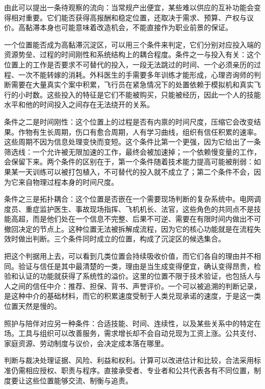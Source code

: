 由此可以提出一条待观察的流向：当常规产出便宜，某些难以供应的互补功能会变得相对重要。它们能否获得高报酬和稳定位置，还取决于需求、预算、产权与议价。高黏滞本身也可能意味着改造机会，不能直接作为职业前景的保证。


一个位置能否成为高黏滞沉淀区，可以用三个条件来判定，它们分别对应投入端的资源势垒、过程的时间刚性和系统结构上的耦合程度。条件之一与投入有关：这个位置上的工作是否要求不可替代的投入，一段无法跳过的时间、一个必须亲历的过程、一次不能转嫁的消耗。外科医生的手需要多年训练才能形成，心理咨询师的判断需要在大量真实个案中积累，飞行员在紧急情况下的处置依赖于模拟机和真实飞行的小时数。这些投入的特征是它们不能被购买，只能被经历，因此一个人的技能水平和他的时间投入之间存在无法绕开的关系。

条件之二是时间刚性：这个位置上的过程是否有内禀的时间尺度，压缩它会改变结果。作物有生长周期，伤口有愈合周期，人有学习曲线，组织有信任积累的速率。这些周期不因为信息处理变快而变短。这个条件比第一个更强，因为它给出了一条筛选线：一个允许被无限加速的工作，最终会被加速掉；一个依赖慢变量的工作，会保留下来。两个条件的区别在于，第一个条件随着技术能力提高可能被削弱：如果某一天训练可以被打包植入，不可替代的投入就不成立了；第二个条件不会，因为它来自物理过程本身的时间尺度。

条件之三是拓扑耦合：这个位置是否嵌在一个需要现场判断的复杂系统中。电网调度员、重症监护医生、事故现场指挥、飞机机长、法官，这些角色的共同点不是技能高超，而是他们处在一个信息不完整、后果不可逆、需要在有限时间内做出不可撤回决定的节点上。这种位置无法被拆解成流程，因为它的核心功能就是在流程失效时做出判断。三个条件同时成立的位置，构成了沉淀区的候选集合。


把这个判据用上去，可以看到几类位置会持续吸收价值，而它们各自的理由并不相同。验证与信任是其中最清楚的一类，理由是当生成变得便宜，确认变得昂贵，检验和认证的功能就获得了系统性的溢价。这里的位置不限于技术验证，也包括人与人之间的信任中介：推荐、担保、背书、声誉评价。一个可以被追溯的判断记录，是这种中介的基础材料，而它的积累速度受制于人类兑现承诺的速度，于是这一类位置天然是慢的。

照护与陪伴对应另一种条件：合适技能、时间、连续性，以及某些关系中的特定在场。工具与组织可以改善服务，需求增长却不会自动兑现为工资上涨。公共支付、家庭资源、劳动制度与议价，会决定成本落在哪里。

判断与裁决处理证据、风险、利益和权利。计算可以改进估计和比较，合法采用标准仍需相应授权、职责与程序。直接承受者、专业者和公共代表各有不同位置，制度要让这些位置能够交流、制衡与追责。

